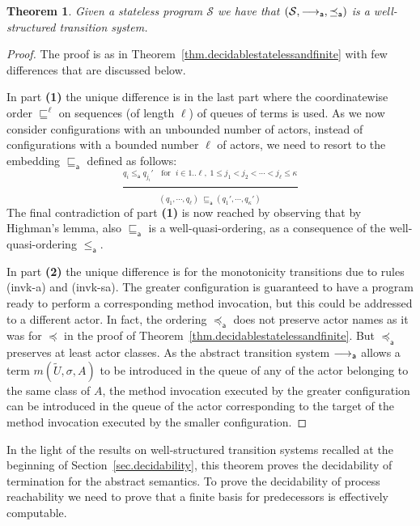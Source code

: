 \documentclass{LMCS}
\newcommand{\cal}{\mathcal}
\theoremstyle{plain}\newtheorem{proposition}[thm]{Proposition}
\theoremstyle{plain}\newtheorem{lemma}[thm]{Lemma}
\theoremstyle{plain}\newtheorem{theorem}[thm]{Theorem}
\theoremstyle{plain}\newtheorem{corollary}[thm]{Corollary}
\newif\ifconf \conffalse
\newcommand{\bigfract}[2]{\frac{^{\textstyle #1}}{_{\textstyle #2}}}
\newcommand{\rulename}[1]{{\sc(#1)}}
\newcommand{\wt}[1]{\widetilde{#1}}
\begin{document}
\begin{theorem}
\label{thm.decidableforunbounded}
Given a stateless program ${\cal S}$
we have that $({\cal S}, \absred{}, \preceq_{\mathsf a})$ is a well-structured transition system.
\end{theorem}

\ifconf
\else

\begin{proof}
The proof is as in Theorem~\ref{thm.decidablestatelessandfinite}
with few differences that are discussed below.

In part {\bf (1)} the unique difference is in the 
last part where the coordinatewise order $\sqsubseteq^\ell$
on sequences (of length $\ell$) of queues of terms 
is used. As we now consider configurations with an unbounded 
number of actors, instead of configurations with a bounded
number $\ell$ of actors, we need to resort to the 
embedding $\sqsubseteq_{\mathsf a}$ defined as follows:
\[
\bigfract{
	q_i \leq_{\mathsf a} q_{j_i}' \quad \mbox{for } \; i \in 1..\ell, \; 
	1 \leq j_1 < j_2 < \cdots < j_\ell \leq \kappa
	}{
	 (q_1, \cdots , q_\ell) 
 \; \sqsubseteq_{\mathsf a} (q_1', \cdots , q_\kappa')
 }
\]
The final contradiction of part {\bf (1)}
is now reached by observing that by Highman's lemma, 
also $\sqsubseteq_{\mathsf a}$ is a well-quasi-ordering, as a consequence
of the well-quasi-ordering $\leq_{\mathsf a}$.

In part {\bf (2)} the unique difference
is for the monotonicity 
transitions due to rules \rulename{invk-a} and \rulename{invk-sa}. The greater configuration
is guaranteed to have a program ready to perform
a corresponding method invocation, but this could 
be addressed to a different actor.
In fact, the ordering $\preceq_{\mathsf a}$
does not preserve actor names as it was for $\preceq$ 
in the proof of Theorem~\ref{thm.decidablestatelessandfinite}. 
But $\preceq_{\mathsf a}$ preserves at least actor
classes. As the abstract transition
system $\stackrel{}{\longrightarrow_{\mathsf a}}$ allows a term $m(\wt{U},\sigma,A)$ to be
introduced in the queue of any of the actor 
belonging to the same class of $A$,
the method invocation executed by the greater
configuration can be introduced in the 
queue of the actor corresponding to the target
of the method invocation executed by the
smaller configuration.
\end{proof}
\fi
In the light of the results on well-structured transition
systems recalled at the beginning of Section~\ref{sec.decidability},
this theorem proves the decidability of termination for the abstract semantics.
To prove the decidability of process reachability
we need to prove that a finite basis for predecessors
is effectively computable.
\end{document}
